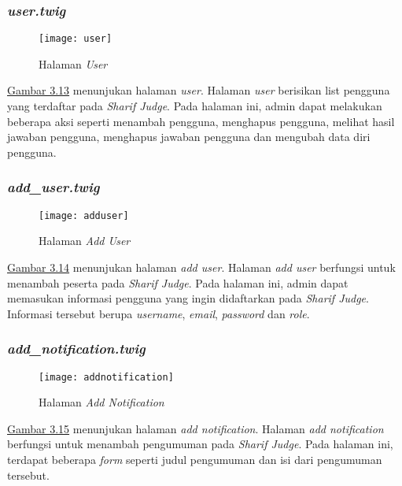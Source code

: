 \subsubsection{\textit{user.twig}}
\begin{figure}[H]
	\centering  
	\texttt{[image: user]}  
	\caption[Halaman \textit{User}]{Halaman \textit{User}} 
	\label{fig:user} 
\end{figure} 
\hyperref[fig:user]{Gambar 3.13} menunjukan halaman \textit{user}. Halaman \textit{user} berisikan list pengguna yang terdaftar pada \textit{Sharif Judge}. Pada halaman ini, admin dapat melakukan beberapa aksi seperti menambah pengguna, menghapus pengguna, melihat hasil jawaban pengguna, menghapus jawaban pengguna dan mengubah data diri pengguna. 

\subsubsection{\textit{add\_user.twig}}
\begin{figure}[H]
	\centering  
	\texttt{[image: adduser]}  
	\caption[Halaman \textit{Add User}]{Halaman \textit{Add User}} 
	\label{fig:adduser} 
\end{figure} 
\hyperref[fig:adduser]{Gambar 3.14} menunjukan halaman \textit{add user}. Halaman \textit{add user} berfungsi untuk menambah peserta pada \textit{Sharif Judge}. Pada halaman ini, admin dapat memasukan informasi pengguna yang ingin didaftarkan pada \textit{Sharif Judge}. Informasi tersebut berupa \textit{username}, \textit{email}, \textit{password} dan \textit{role}.

\subsubsection{\textit{add\_notification.twig}}
\begin{figure}[H]
	\centering  
	\texttt{[image: addnotification]}  
	\caption[Halaman \textit{Add Notification}]{Halaman \textit{Add Notification}} 
	\label{fig:addnotification} 
\end{figure} 
\hyperref[fig:addnotification]{Gambar 3.15} menunjukan halaman \textit{add notification}. Halaman \textit{add notification} berfungsi untuk menambah pengumuman pada \textit{Sharif Judge}. Pada halaman ini, terdapat beberapa \textit{form} seperti judul pengumuman dan isi dari pengumuman tersebut.  

